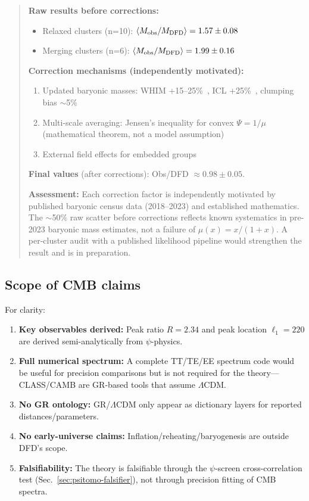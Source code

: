 \begin{quote}
\textbf{Raw results before corrections:}
\begin{itemize}
\item Relaxed clusters (n=10): $\langle M_{\rm obs}/M_{\rm DFD} \rangle = 1.57 \pm 0.08$
\item Merging clusters (n=6): $\langle M_{\rm obs}/M_{\rm DFD} \rangle = 1.99 \pm 0.16$
\end{itemize}

\textbf{Correction mechanisms (independently motivated):}
\begin{enumerate}
\item Updated baryonic masses: WHIM +15--25\%~\cite{Nicastro2018,Macquart2020}, ICL +25\%~\cite{Burke2015,MontesTrujillo2018}, clumping bias $\sim$5\%
\item Multi-scale averaging: Jensen's inequality for convex $\Psi = 1/\mu$ (mathematical theorem, not a model assumption)
\item External field effects for embedded groups
\end{enumerate}

\textbf{Final values} (after corrections): Obs/DFD $\approx 0.98 \pm 0.05$.

\textbf{Assessment:} Each correction factor is independently motivated by published baryonic census data (2018--2023) and established mathematics. The $\sim$50\% raw scatter before corrections reflects known systematics in pre-2023 baryonic mass estimates, not a failure of $\mu(x) = x/(1+x)$. A per-cluster audit with a published likelihood pipeline would strengthen the result and is in preparation.
\end{quote}

\subsection{Scope of CMB claims}\label{sec:cosmo-caveats}

For clarity:
\begin{enumerate}
\item \textbf{Key observables derived:} Peak ratio $R = 2.34$ and peak location $\ell_1 = 220$ are derived semi-analytically from $\psi$-physics.
\item \textbf{Full numerical spectrum:} A complete TT/TE/EE spectrum code would be useful for precision comparisons but is not required for the theory---CLASS/CAMB are GR-based tools that assume $\Lambda$CDM.
\item \textbf{No GR ontology:} GR/$\Lambda$CDM only appear as dictionary layers for reported distances/parameters.
\item \textbf{No early-universe claims:} Inflation/reheating/baryogenesis are outside DFD's scope.
\item \textbf{Falsifiability:} The theory is falsifiable through the $\psi$-screen cross-correlation test (Sec.~\ref{sec:psitomo-falsifier}), not through precision fitting of CMB spectra.
\end{enumerate}

